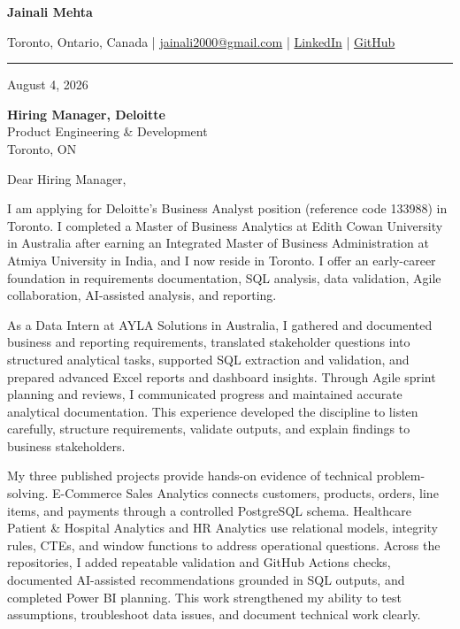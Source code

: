 \documentclass[letterpaper,10pt]{article}
\begin{document}
\begin{center}
  {\fontsize{17}{19}\selectfont\textbf{Jainali Mehta}}\par\vspace{2pt}
  \small Toronto, Ontario, Canada \;|\;
  \href{mailto:jainali2000@gmail.com}{jainali2000@gmail.com} \;|\;
  \href{https://www.linkedin.com/in/jainali-mehta}{LinkedIn} \;|\;
  \href{https://github.com/jainalimehta}{GitHub}
\end{center}
\vspace{-5pt}
\noindent\rule{\textwidth}{0.4pt}

August 4, 2026

\textbf{Hiring Manager, Deloitte}\\
Product Engineering \& Development\\
Toronto, ON

Dear Hiring Manager,

I am applying for Deloitte's Business Analyst position (reference code 133988) in Toronto. I completed a Master of Business Analytics at Edith Cowan University in Australia after earning an Integrated Master of Business Administration at Atmiya University in India, and I now reside in Toronto. I offer an early-career foundation in requirements documentation, SQL analysis, data validation, Agile collaboration, AI-assisted analysis, and reporting.

As a Data Intern at AYLA Solutions in Australia, I gathered and documented business and reporting requirements, translated stakeholder questions into structured analytical tasks, supported SQL extraction and validation, and prepared advanced Excel reports and dashboard insights. Through Agile sprint planning and reviews, I communicated progress and maintained accurate analytical documentation. This experience developed the discipline to listen carefully, structure requirements, validate outputs, and explain findings to business stakeholders.

My three published projects provide hands-on evidence of technical problem-solving. E-Commerce Sales Analytics connects customers, products, orders, line items, and payments through a controlled PostgreSQL schema. Healthcare Patient \& Hospital Analytics and HR Analytics use relational models, integrity rules, CTEs, and window functions to address operational questions. Across the repositories, I added repeatable validation and GitHub Actions checks, documented AI-assisted recommendations grounded in SQL outputs, and completed Power BI planning. This work strengthened my ability to test assumptions, troubleshoot data issues, and document technical work clearly.
\end{document}
